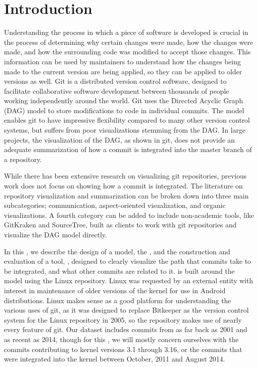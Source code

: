 \chapter{Introduction}

Understanding the process in which a piece of software is developed is
crucial in the process of determining why certain changes were made, how
the changes were made, and how the surrounding code was modified to
accept those changes. This information can be used by maintainers to
understand how the changes being made to the current version are being
applied, so they can be applied to older versions as well. Git is a
distributed version control software, designed to facilitate
collaborative software development between thousands of people working
independently around the world. Git uses the Directed Acyclic Graph
(DAG) model to store modifications to code in individual commits. The
model enables git to have impressive flexibility compared to many other
version control systems, but suffers from poor visualizations stemming
from the DAG\@. In large projects, the visualization of the DAG, as
shown in git, does not provide an adequate summarization of how a commit
is integrated into the master branch of a repository.

While there has been extensive research on visualizing git repositories,
previous work does not focus on showing how a commit is integrated. The
literature on repository visualization and summarization can be broken
down into three main subcategories;
communication\cite{Cubranic2005,Begel2010}, aspect-oriented
visualization\cite{Ambros2005,Burch2005,Ambros2009}, and organic
visualizations\cite{ogawa09,Caudwell2010}. A fourth category can be
added to include non-academic tools, like GitKraken and SourceTree,
built as clients to work with git repositories and visualize the DAG
model directly.

In this \paper{} , we describe the
design of a model, the \mt{}, and the construction and evaluation of a
tool, \tool{}, designed to clearly visualize the path that commits take
to be integrated, and what other commits are related to it. \tool{} is
built around the \mt{} model using the Linux repository. Linux was
requested by an external entity with interest in maintenance of older
versions of the kernel for use in Android distributions. Linux makes
sense as a good platform for understanding the various uses of git, as
it was designed to replace Bitkeeper as the version control system for
the Linux repository in 2005, so the repository makes use of nearly
every feature of git. Our dataset includes commits from as far back as
2001 and as recent as 2014, though for this \paper{}, we will mostly
concern ourselves with the commits contributing to kernel versions 3.1
through 3.16, or the commits that were integrated into the kernel
between October, 2011 and August 2014.

